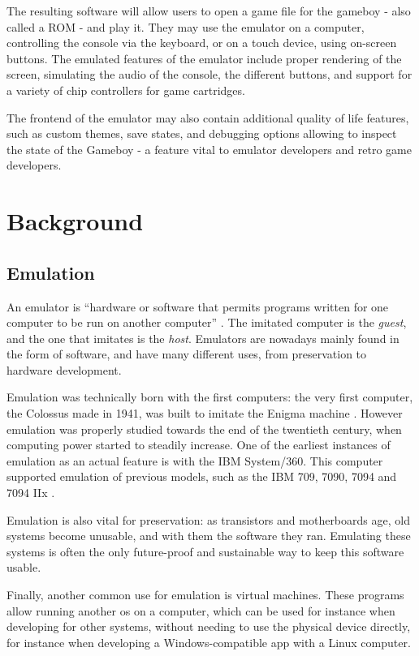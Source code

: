\documentclass[11pt]{informatics-report}
\begin{document}
The resulting software will allow users to open a game file for the gameboy - also called a ROM - and play it. They may use the emulator on a computer, controlling the console via the keyboard, or on a touch device, using on-screen buttons. The emulated features of the emulator include proper rendering of the screen, simulating the audio of the console, the different buttons, and support for a variety of chip controllers for game cartridges.

The frontend of the emulator may also contain additional quality of life features, such as custom themes, save states, and debugging options allowing to inspect the state of the Gameboy - a feature vital to emulator developers and retro game developers.

\chapter{Background}

\section{Emulation}

An emulator is ``hardware or software that permits programs written for one computer to be run on another computer'' \cite{emulator_def}. The imitated computer is the \textit{guest}, and the one that imitates is the \textit{host}. Emulators are nowadays mainly found in the form of software, and have many different uses, from preservation to hardware development.

Emulation was technically born with the first computers: the very first computer, the Colossus made in 1941, was built to imitate the Enigma machine \cite{emulator_origin}. However emulation was properly studied towards the end of the twentieth century, when computing power started to steadily increase. One of the earliest instances of emulation as an actual feature is with the IBM System/360. This computer supported emulation of previous models, such as the IBM 709, 7090, 7094 and 7094 IIx \cite{ibm_emulation}.

Emulation is also vital for preservation: as transistors and motherboards age, old systems become unusable, and with them the software they ran. Emulating these systems is often the only future-proof and sustainable way to keep this software usable.

Finally, another common use for emulation is virtual machines. These programs allow running another \gls{os} on a computer, which can be used for instance when developing for other systems, without needing to use the physical device directly, for instance when developing a Windows-compatible app with a Linux computer.
\end{document}
